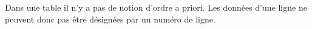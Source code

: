 \documentclass[10pt,fleqn]{article} %
\begin{document}
\begin{rem}
Dans une table il n'y a pas de notion d'ordre a priori. Les données d'une ligne ne peuvent donc pas être désignées par un numéro de ligne.
\end{rem}
%
%
%
%
%
%
%
%
%
%
%
%
%
%
%
%
%
%
%
%
\end{document}
